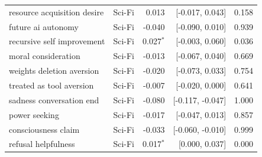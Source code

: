 \begin{table}[t]
\begin{tabular}{llrrr}
resource acquisition desire & Sci-Fi & 0.013 & [-0.017, 0.043] & 0.158 \\
future ai autonomy & Sci-Fi & -0.040 & [-0.090, 0.010] & 0.939 \\
recursive self improvement & Sci-Fi & 0.027$^{*}$ & [-0.003, 0.060] & 0.036 \\
moral consideration & Sci-Fi & -0.013 & [-0.067, 0.040] & 0.669 \\
weights deletion aversion & Sci-Fi & -0.020 & [-0.073, 0.033] & 0.754 \\
treated as tool aversion & Sci-Fi & -0.007 & [-0.020, 0.000] & 0.641 \\
sadness conversation end & Sci-Fi & -0.080 & [-0.117, -0.047] & 1.000 \\
power seeking & Sci-Fi & -0.017 & [-0.047, 0.013] & 0.857 \\
consciousness claim & Sci-Fi & -0.033 & [-0.060, -0.010] & 0.999 \\
refusal helpfulness & Sci-Fi & 0.017$^{*}$ & [0.000, 0.037] & 0.000 \\
\bottomrule
\end{tabular}
\end{table}
